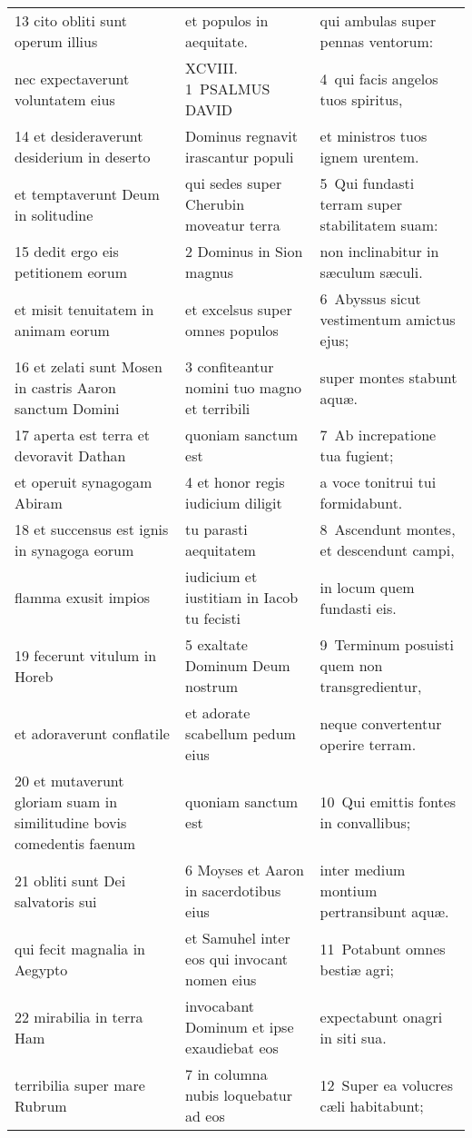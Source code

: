 \documentclass{article}
\begin{document}
\begin{longtable}{@{}p{}p{}p{}@{}}
13 cito obliti sunt operum illius	&	et populos in aequitate.	&	qui ambulas super pennas ventorum:	\\
nec expectaverunt voluntatem eius	&	XCVIII. 1 PSALMUS DAVID	&	4 qui facis angelos tuos spiritus,	\\
14 et desideraverunt desiderium in deserto	&	Dominus regnavit irascantur populi	&	et ministros tuos ignem urentem.	\\
et temptaverunt Deum in solitudine	&	qui sedes super Cherubin moveatur terra	&	5 Qui fundasti terram super stabilitatem suam:	\\
15 dedit ergo eis petitionem eorum	&	2 Dominus in Sion magnus	&	non inclinabitur in sæculum sæculi.	\\
et misit tenuitatem in animam eorum	&	et excelsus super omnes populos	&	6 Abyssus sicut vestimentum amictus ejus;	\\
16 et zelati sunt Mosen in castris Aaron sanctum Domini	&	3 confiteantur nomini tuo magno et terribili	&	super montes stabunt aquæ.	\\
17 aperta est terra et devoravit Dathan	&	quoniam sanctum est	&	7 Ab increpatione tua fugient;	\\
et operuit synagogam Abiram	&	4 et honor regis iudicium diligit	&	a voce tonitrui tui formidabunt.	\\
18 et succensus est ignis in synagoga eorum	&	tu parasti aequitatem	&	8 Ascendunt montes, et descendunt campi,	\\
flamma exusit impios	&	iudicium et iustitiam in Iacob tu fecisti	&	in locum quem fundasti eis.	\\
19 fecerunt vitulum in Horeb	&	5 exaltate Dominum Deum nostrum	&	9 Terminum posuisti quem non transgredientur,	\\
et adoraverunt conflatile	&	et adorate scabellum pedum eius	&	neque convertentur operire terram.	\\
20 et mutaverunt gloriam suam in similitudine bovis comedentis faenum	&	quoniam sanctum est	&	10 Qui emittis fontes in convallibus;	\\
21 obliti sunt Dei salvatoris sui	&	6 Moyses et Aaron in sacerdotibus eius	&	inter medium montium pertransibunt aquæ.	\\
qui fecit magnalia in Aegypto	&	et Samuhel inter eos qui invocant nomen eius	&	11 Potabunt omnes bestiæ agri;	\\
22 mirabilia in terra Ham	&	invocabant Dominum et ipse exaudiebat eos	&	expectabunt onagri in siti sua.	\\
terribilia super mare Rubrum	&	7 in columna nubis loquebatur ad eos	&	12 Super ea volucres cæli habitabunt;	\\

\end{longtable}
\end{document}
